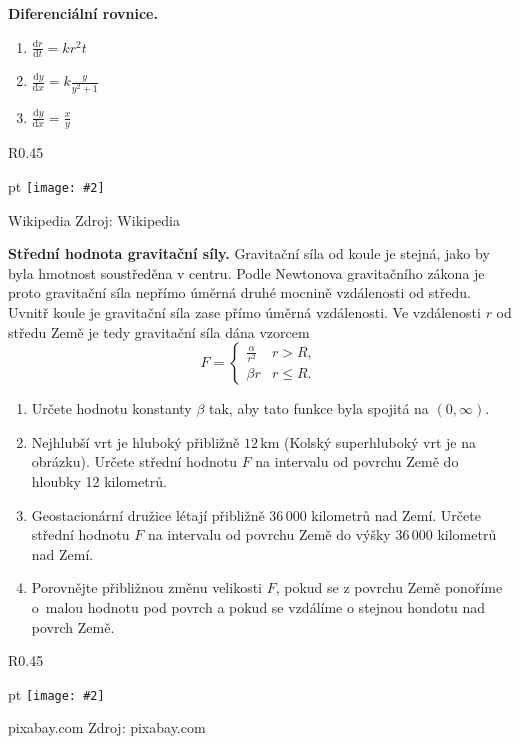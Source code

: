 \documentclass{article}
\def\zlomek{0.45}
\def\nic{}
\newcommand\obrazek[2][pixabay.com]{
  \clearpage
  \def\test{#1}
\begin{wrapfigure}{R}{\zlomek\linewidth}
  \begin{minipage}{1.0\linewidth}\parskip 0 pt
  \texttt{[image: \#2]}

  \vspace*{-10pt}
  \ifx\test\nic\else
  \null\hfill{\color{gray}\footnotesize Zdroj: #1}
  \fi

  \mezera
  \end{minipage}
\end{wrapfigure}
}
\let\oldtextbf\textbf
\def\textbf#1{%
  \oldtextbf{\color{red} #1}}
\def\mezera{\vspace*{10pt}}
\begin{document}
\newpage


\textbf{Diferenciální rovnice.}

\begin{enumerate}[1)]
   pt
\item $\frac{\mathrm dr}{\mathrm dt}=kr^2t$
\item $\frac{\mathrm dy}{\mathrm dx}=k\frac{y}{y^2+1}$
\item $\frac{\mathrm dy}{\mathrm dx}=\frac x{y}$

\end{enumerate}


\def\mezera{\vspace*{-20pt}}


\obrazek[Wikipedia]{vrt.jpg}

\textbf{Střední hodnota gravitační síly.}
Gravitační síla od koule je stejná, jako by byla hmotnost soustředěna
v centru. Podle Newtonova gravitačního zákona je proto gravitační síla
nepřímo úměrná druhé mocnině vzdálenosti od středu.
Uvnitř koule je gravitační síla zase přímo úměrná vzdálenosti. Ve vzdálenosti $r$ od středu Země je tedy gravitační síla dána vzorcem
$$F=
\begin{cases}
    \frac{\alpha}{r^2} & r>R,\\
  \beta r & r\leq R.
\end{cases}
$$

\vspace*{-10pt}
\begin{enumerate} pt
\item Určete hodnotu konstanty $\beta$ tak, aby tato funkce byla
  spojitá na $(0,\infty)$. 
\item Nejhlubší vrt je hluboký přibližně $12\,\mathrm{km}$ (Kolský superhluboký vrt je na obrázku). Určete
střední hodnotu $F$ na intervalu od povrchu Země do hloubky
12 kilometrů.  
\item Geostacionární družice létají přibližně 36\,000 kilometrů nad
Zemí. Určete střední hodnotu $F$ na intervalu od povrchu
Země do výšky 36\,000 kilometrů nad Zemí.
\item Porovnějte přibližnou změnu velikosti $F$, pokud se z povrchu Země ponoříme o~malou hodnotu pod povrch a pokud se vzdálíme o stejnou hondotu nad povrch Země.
\end{enumerate}

\newpage

\def\mezera{\vspace*{-20pt}}


\obrazek{horizont.jpg}
\end{document}
